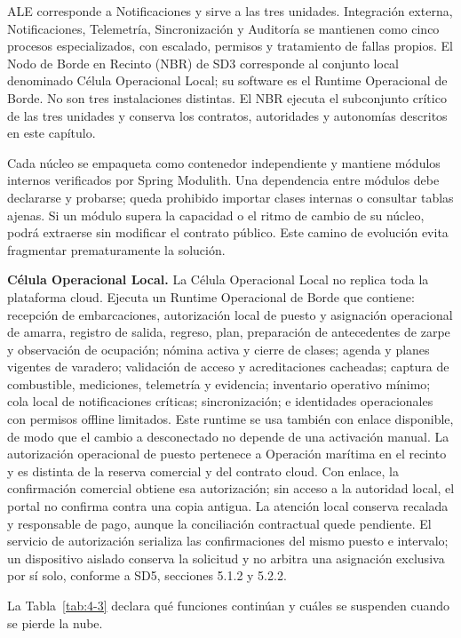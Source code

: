 ALE corresponde a Notificaciones y sirve a las tres unidades. Integración externa, Notificaciones, Telemetría, Sincronización y Auditoría se mantienen como cinco procesos especializados, con escalado, permisos y tratamiento de fallas propios. El Nodo de Borde en Recinto (NBR) de SD3 corresponde al conjunto local denominado Célula Operacional Local; su software es el Runtime Operacional de Borde. No son tres instalaciones distintas. El NBR ejecuta el subconjunto crítico de las tres unidades y conserva los contratos, autoridades y autonomías descritos en este capítulo.

Cada núcleo se empaqueta como contenedor independiente y mantiene módulos internos verificados por Spring Modulith. Una dependencia entre módulos debe declararse y probarse; queda prohibido importar clases internas o consultar tablas ajenas. Si un módulo supera la capacidad o el ritmo de cambio de su núcleo, podrá extraerse sin modificar el contrato público. Este camino de evolución evita fragmentar prematuramente la solución.

\textbf{Célula Operacional Local.} La Célula Operacional Local no replica toda la plataforma cloud. Ejecuta un Runtime Operacional de Borde que contiene: recepción de embarcaciones, autorización local de puesto y asignación operacional de amarra, registro de salida, regreso, plan, preparación de antecedentes de zarpe y observación de ocupación; nómina activa y cierre de clases; agenda y planes vigentes de varadero; validación de acceso y acreditaciones cacheadas; captura de combustible, mediciones, telemetría y evidencia; inventario operativo mínimo; cola local de notificaciones críticas; sincronización; e identidades operacionales con permisos offline limitados. Este runtime se usa también con enlace disponible, de modo que el cambio a desconectado no depende de una activación manual. La autorización operacional de puesto pertenece a Operación marítima en el recinto y es distinta de la reserva comercial y del contrato cloud. Con enlace, la confirmación comercial obtiene esa autorización; sin acceso a la autoridad local, el portal no confirma contra una copia antigua. La atención local conserva recalada y responsable de pago, aunque la conciliación contractual quede pendiente. El servicio de autorización serializa las confirmaciones del mismo puesto e intervalo; un dispositivo aislado conserva la solicitud y no arbitra una asignación exclusiva por sí solo, conforme a SD5, secciones 5.1.2 y 5.2.2.

La Tabla~\ref{tab:4-3} declara qué funciones continúan y cuáles se suspenden cuando se pierde la nube.

